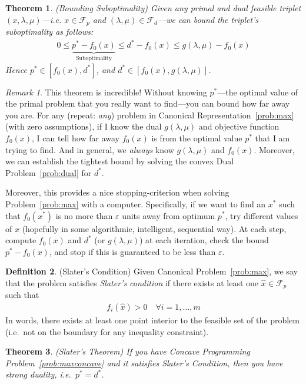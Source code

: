 \documentclass[12pt]{book}
\numberwithin{equation}{section} %
\theoremstyle{plain}
\newtheorem{thm}{Theorem}[section]
\theoremstyle{definition}
\newtheorem{defn}[thm]{Definition}
\theoremstyle{remark}
\newtheorem*{rmk}{Remark}
\begin{document}
\begin{thm}{\emph{(Bounding Suboptimality)}}
Given \emph{any} primal and dual feasible triplet
$(x,\lambda,\mu)$---i.e. $x\in\mathscr{F}_p$ and
$(\lambda,\mu)\in\mathscr{F}_d$---we can bound the triplet's
suboptimality as follows:
\begin{align*}
  0 \leq \underbrace{p^* - f_0(x)}_{\text{Suboptimality}}
  \leq d^* - f_0(x)
  \leq g(\lambda,\mu) - f_0(x)
\end{align*}
Hence $p^*\in [f_0(x), d^*]$, and $d^*\in[f_0(x),g(\lambda,\mu)]$.
\end{thm}
\begin{rmk}
This theorem is incredible! Without knowing $p^*$---the optimal value of
the primal problem that you really want to find---you can bound how far
away you are. For any (repeat: \emph{any}) problem in Canonical
Representation~\ref{prob:max} (with zero assumptions), if I know the
dual $g(\lambda,\mu)$ and objective function $f_0(x)$, I can tell how
far away $f_0(x)$ is from the optimal value $p^*$ that I am trying to
find. And in general, we \emph{always} know $g(\lambda,\mu)$ and
$f_0(x)$. Moreover, we can establish the tightest bound by solving the
convex Dual Problem~\ref{prob:dual} for $d^*$.

Moreover, this provides a nice stopping-criterion when solving
Problem~\ref{prob:max} with a computer. Specifically, if we want to find
an $x^*$ such that $f_0(x^*)$ is
no more than $\varepsilon$ units away from  optimum $p^*$, try different
values of $x$ (hopefully in some algorithmic, intelligent, sequential
way). At each step, compute $f_0(x)$ and $d^*$ (or $g(\lambda,\mu)$) at
each iteration, check the bound $p^*-f_0(x)$, and stop if this is
guaranteed to be less than $\varepsilon$.
\end{rmk}

\begin{defn}{(Slater's Condition)}
Given Canonical Problem~\ref{prob:max}, we say that the problem
satisfies \emph{Slater's condition} if there exists at least one
$\hat{x}\in\mathscr{F}_p$ such that
\begin{align*}
  f_i(\hat{x})>0
  \quad \forall i=1,\ldots,m
\end{align*}
In words, there exists at least one point interior to the feasible set
of the problem (i.e.\ not on the boundary for any inequality
constraint).
\end{defn}

\begin{thm}{\emph{(Slater's Theorem)}}
If you have Concave Programming Problem~\ref{prob:maxconcave} and it
satisfies Slater's Condition, then you have strong duality, i.e.\
$p^*=d^*$.
\end{thm}
\end{document}
